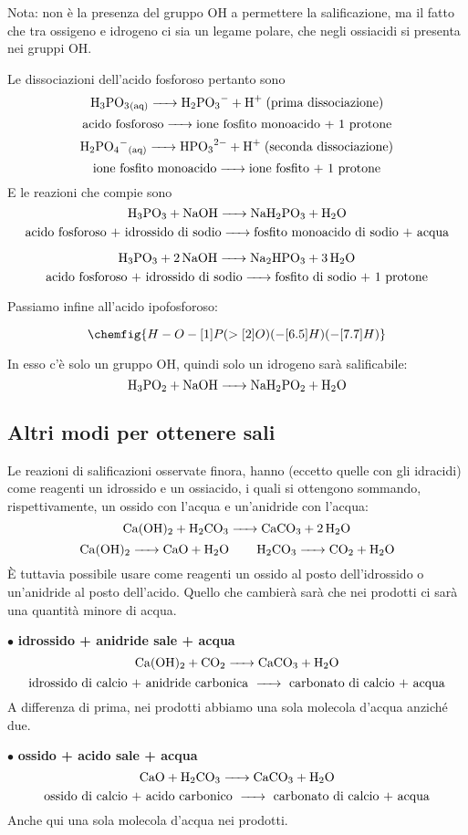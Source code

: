 Nota: non è la presenza del gruppo OH a permettere la salificazione, ma il fatto che tra ossigeno e idrogeno ci sia un legame polare, che negli ossiacidi si presenta nei gruppi OH.

\vspace{0.2cm}Le dissociazioni dell'acido fosforoso pertanto sono
$$\ce{H_3PO_3_{(aq)} -> H_2PO_3- + H+}\; \text{(prima dissociazione)}$$
$$\text{acido fosforoso}\ce{->}\text{ione fosfito monoacido + 1 protone}$$
$$\ce{H_2PO_4^-_{(aq)} -> HPO_3^{2-} + H+}\; \text{(seconda dissociazione)}$$
$$\text{ione fosfito monoacido}\ce{->}\text{ione fosfito + 1 protone}$$
E le reazioni che compie sono
$$\ce{H_3PO_3 + NaOH -> NaH_2PO_3 + H_2O}$$
$$\text{acido fosforoso + idrossido di sodio}\ce{->}\text{fosfito monoacido di sodio + acqua}$$

$$\ce{H_3PO_3 + 2 NaOH -> Na_2HPO_3 + 3 H_2O}$$
$$\text{acido fosforoso + idrossido di sodio}\ce{->}\text{fosfito di sodio + 1 protone}$$

Passiamo infine all'acido ipofosforoso:

$${\chemfig{H-O-[1]P(>[2]O)(-[6.5]H)(-[7.7]H)}}$$

In esso c'è solo un gruppo OH, quindi solo un idrogeno sarà salificabile:
$$\ce{H_3PO_2 + NaOH -> NaH_2PO_2 + H_2O}$$
\subsection{Altri modi per ottenere sali}
Le reazioni di salificazioni osservate finora, hanno (eccetto quelle con gli idracidi) come reagenti un idrossido e un ossiacido, i quali si ottengono sommando, rispettivamente, un ossido con l'acqua e un'anidride con l'acqua:
$$\ce{Ca(OH)_2 + H_2CO_3 -> CaCO_3 + 2 H_2O}$$
$$\ce{Ca(OH)_2 -> CaO + H2O \qquad H_2CO_3 -> CO_2 + H_2O}$$
È tuttavia possibile usare come reagenti un ossido al posto dell'idrossido  o un'anidride al posto dell'acido. Quello che cambierà sarà che nei prodotti ci sarà una quantità minore di acqua.

\vspace{0.2cm}$\bullet$ \textbf{ idrossido + anidride \ce{->} sale + acqua}
$$\ce{Ca(OH)_2 + CO_2 -> CaCO_3 + H_2O}$$
$$\text{idrossido di calcio + anidride carbonica \ce{->} carbonato di calcio + acqua}$$
A differenza di prima, nei prodotti abbiamo una sola molecola d'acqua anziché due.

\vspace{0.2cm}$\bullet$ \textbf{ ossido + acido \ce{->} sale + acqua}
$$\ce{CaO + H_2CO_3 -> CaCO_3 + H_2O}$$
$$\text{ossido di calcio + acido carbonico \ce{->} carbonato di calcio + acqua}$$
Anche qui una sola molecola d'acqua nei prodotti.

